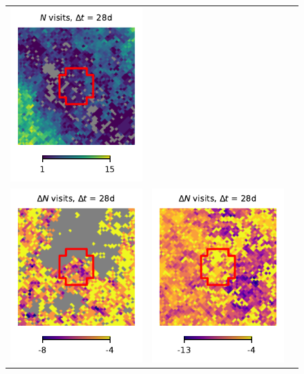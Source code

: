 \documentclass[preprintm,linenumbers]{aastex631}
\begin{document}
\begin{figure}
\begin{tabular}{  c c c}
				\includegraphics{results/skymaps_cutout/skymaps_cutout_first_year_one_snap_v4_0_10yrs_db_noDD_noTwi_tscale-28_nside-256_doAllTemplateMetrics_reduceCount_r_GP_noDD_noTwi.pdf} \\
				\includegraphics{results/skymaps_cutout/skymaps_cutout_delta_first_year_one_snap_v4_0_10yrs_db_noDD_noTwi_tscale-28_nside-256_doAllTemplateMetrics_reduceCount_r_NES_noDD_noTwi.pdf} &
				\includegraphics{results/skymaps_cutout/skymaps_cutout_delta_first_year_one_snap_v4_0_10yrs_db_noDD_noTwi_tscale-28_nside-256_doAllTemplateMetrics_reduceCount_r_WFD_noDD_noTwi.pdf} &

\end{tabular}
\end{figure}
\end{document}
